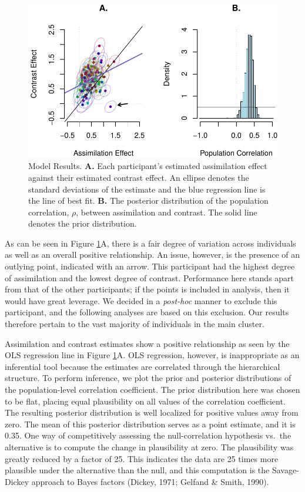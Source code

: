 \documentclass[english,floatsintext,man]{apa6}
\begin{document}
\begin{figure}[htbp]
\centering
\includegraphics{paper_files/figure-latex/modelfiguresminus-1.pdf}
\caption{\label{fig:modelfiguresminus}Model Results. \textbf{A.} Each
participant's estimated assimilation effect against their estimated
contrast effect. An ellipse denotes the standard deviations of the
estimate and the blue regression line is the line of best fit.
\textbf{B.} The posterior distribution of the population correlation,
\(\rho\), between assimilation and contrast. The solid line denotes the
prior distribution.}
\end{figure}

As can be seen in Figure \ref{fig:modelfiguresminus}A, there is a fair
degree of variation across individuals as well as an overall positive
relationship. An issue, however, is the presence of an outlying point,
indicated with an arrow. This participant had the highest degree of
assimilation and the lowest degree of contrast. Performance here stands
apart from that of the other participants; if the points is included in
analysis, then it would have great leverage. We decided in a
\emph{post-hoc} manner to exclude this participant, and the following
analyses are based on this exclusion. Our results therefore pertain to
the vast majority of individuals in the main cluster.

Assimilation and contrast estimates show a positive relationship as seen
by the OLS regression line in Figure \ref{fig:modelfiguresminus}A. OLS
regression, however, is inappropriate as an inferential tool because the
estimates are correlated through the hierarchical structure. To perform
inference, we plot the prior and posterior distributions of the
population-level correlation coefficient. The prior distribution here
was chosen to be flat, placing equal plausibility on all values of the
correlation coefficient. The resulting posterior distribution is well
localized for positive values away from zero. The mean of this posterior
distribution serves as a point estimate, and it is 0.35. One way of
competitively assessing the null-correlation hypothesis vs.~the
alternative is to compute the change in plausibility at zero. The
plausibility was greatly reduced by a factor of 25. This indicates the
data are 25 times more plausible under the alternative than the null,
and this computation is the Savage-Dickey approach to Bayes factors
(Dickey, 1971; Gelfand \& Smith, 1990).
\end{document}
